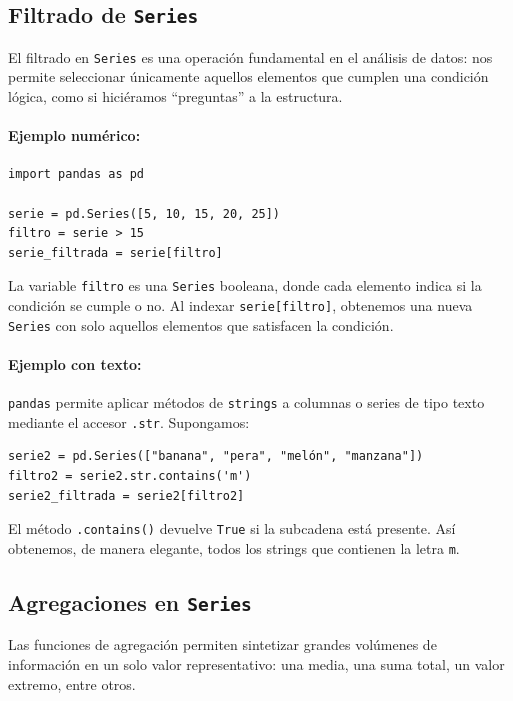 \documentclass{article}
\theoremstyle{nonumberplain}
\begin{document}
\subsection*{Filtrado de \texttt{Series}}

El filtrado en \texttt{Series} es una operación fundamental en el análisis de datos: nos permite seleccionar únicamente aquellos elementos que cumplen una condición lógica, como si hiciéramos “preguntas” a la estructura.

\paragraph{Ejemplo numérico:}

\begin{verbatim}
import pandas as pd

serie = pd.Series([5, 10, 15, 20, 25])
filtro = serie > 15
serie_filtrada = serie[filtro]
\end{verbatim}

La variable \texttt{filtro} es una \texttt{Series} booleana, donde cada elemento indica si la condición se cumple o no. Al indexar \texttt{serie[filtro]}, obtenemos una nueva \texttt{Series} con solo aquellos elementos que satisfacen la condición.

\paragraph{Ejemplo con texto:}

\texttt{pandas} permite aplicar métodos de \texttt{strings} a columnas o series de tipo texto mediante el accesor \texttt{.str}. Supongamos:

\begin{verbatim}
serie2 = pd.Series(["banana", "pera", "melón", "manzana"])
filtro2 = serie2.str.contains('m')
serie2_filtrada = serie2[filtro2]
\end{verbatim}

El método \texttt{.contains()} devuelve \texttt{True} si la subcadena está presente. Así obtenemos, de manera elegante, todos los strings que contienen la letra \texttt{m}.

\subsection*{Agregaciones en \texttt{Series}}

Las funciones de agregación permiten sintetizar grandes volúmenes de información en un solo valor representativo: una media, una suma total, un valor extremo, entre otros. 
\end{document}
